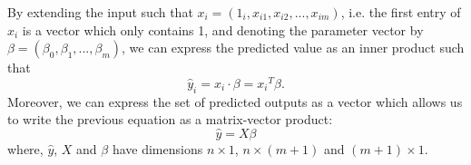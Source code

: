 By extending the input such that ${x}_i = (1_i, x_{i1}, x_{i2}, ..., x_{im})$, i.e. the first entry of $x_i$ is a vector which only contains 1, and denoting the parameter vector by ${\beta} = (\beta_0, \beta_1, ..., \beta_m)$, we can express the predicted value as an inner product such that   
\begin{equation*}
    \hat{y}_i = {x_i}\cdot {\beta} = {x_i}^T{\beta}.
\end{equation*}
Moreover, we can express the set of predicted outputs as a vector which allows us to write the previous equation as a matrix-vector product:
\begin{equation}
    \hat{y} = {X}{\beta} \label{eq:lin_reg_matrix_model}
\end{equation}
where, $\hat{y}$, ${X}$ and ${\beta}$ have dimensions $n \times 1$, $n \times (m+1)$ and $(m+1) \times 1$.

